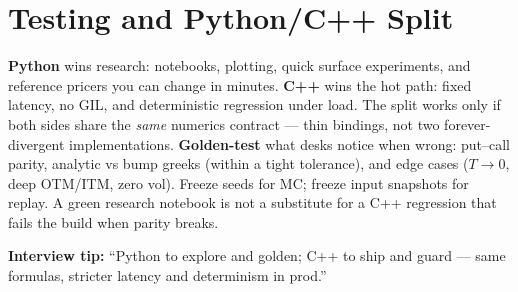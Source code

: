 \section{Testing and Python/C++ Split}
\label{sec:testing-quant-code}
\textbf{Python} wins research: notebooks, plotting, quick surface experiments, and 
reference pricers you can change in minutes. \textbf{C++} wins the hot path: fixed 
latency, no GIL, and deterministic regression under load. The split works only if both 
sides share the \emph{same} numerics contract --- thin bindings, not two forever-divergent 
implementations.
\newline
\textbf{Golden-test} what desks notice when wrong: put--call parity, analytic vs bump 
greeks (within a tight tolerance), and edge cases ($T \to 0$, deep OTM/ITM, zero vol). 
Freeze seeds for MC; freeze input snapshots for replay. A green research notebook is not 
a substitute for a C++ regression that fails the build when parity breaks.
\par\noindent\textbf{Interview tip:} ``Python to explore and golden; C++ to ship and 
guard --- same formulas, stricter latency and determinism in prod.''

